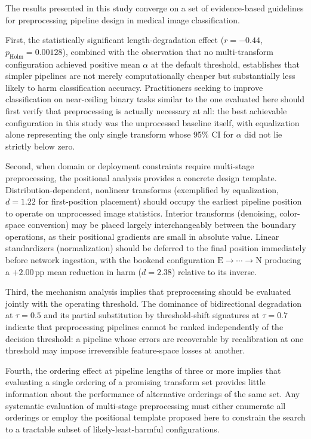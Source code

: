 \documentclass[preprint,5p,times,twocolumn]{elsarticle}
\begin{document}
The results presented in this study converge on a set of evidence-based guidelines for preprocessing pipeline design in medical image classification.

First, the statistically significant length-degradation effect ($r = -0.44$, $p_{\text{Holm}} = 0.00128$), combined with the observation that no multi-transform configuration achieved positive mean $\alpha$ at the default threshold, establishes that simpler pipelines are not merely computationally cheaper but substantially less likely to harm classification accuracy. Practitioners seeking to improve classification on near-ceiling binary tasks similar to the one evaluated here should first verify that preprocessing is actually necessary at all: the best achievable configuration in this study was the unprocessed baseline itself, with equalization alone representing the only single transform whose 95\% CI for $\alpha$ did not lie strictly below zero.

Second, when domain or deployment constraints require multi-stage preprocessing, the positional analysis provides a concrete design template. Distribution-dependent, nonlinear transforms (exemplified by equalization, $d = 1.22$ for first-position placement) should occupy the earliest pipeline position to operate on unprocessed image statistics. Interior transforms (denoising, color-space conversion) may be placed largely interchangeably between the boundary operations, as their positional gradients are small in absolute value. Linear standardizers (normalization) should be deferred to the final position immediately before network ingestion, with the bookend configuration $\text{E} \to \cdots \to \text{N}$ producing a $+2.00$\,pp mean reduction in harm ($d = 2.38$) relative to its inverse.

Third, the mechanism analysis implies that preprocessing should be evaluated jointly with the operating threshold. The dominance of bidirectional degradation at $\tau = 0.5$ and its partial substitution by threshold-shift signatures at $\tau = 0.7$ indicate that preprocessing pipelines cannot be ranked independently of the decision threshold: a pipeline whose errors are recoverable by recalibration at one threshold may impose irreversible feature-space losses at another.

Fourth, the ordering effect at pipeline lengths of three or more implies that evaluating a single ordering of a promising transform set provides little information about the performance of alternative orderings of the same set. Any systematic evaluation of multi-stage preprocessing must either enumerate all orderings or employ the positional template proposed here to constrain the search to a tractable subset of likely-least-harmful configurations.
\end{document}
